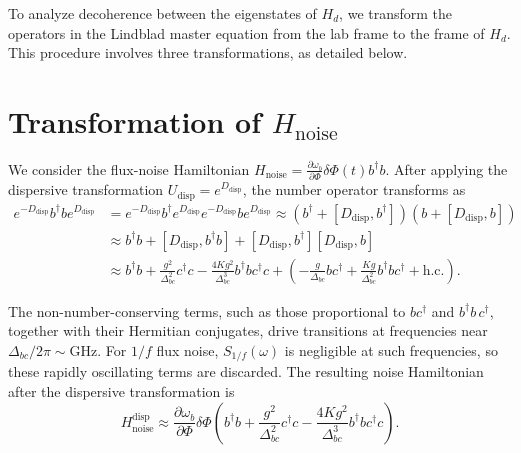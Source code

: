 To analyze decoherence between the eigenstates of $H_d$, we transform the operators in the Lindblad master equation from the lab frame to the frame of $H_d$. This procedure involves three transformations, as detailed below.

\section*{Transformation of $H_{\mathrm{noise}}$}
\label{subsec:Hnoise_transfer}

We consider the flux-noise Hamiltonian
$H_{\mathrm{noise}} = \frac{\partial \omega_b}{\partial \Phi} \delta \Phi(t) b^\dagger b$.
After applying the dispersive transformation $U_{\mathrm{disp}} = e^{D_{\mathrm{disp}}}$, the number operator transforms as
\begin{align}
    e^{-D_{\mathrm{disp}}} b^\dagger b e^{D_{\mathrm{disp}}}
    &= e^{-D_{\mathrm{disp}}} b^\dagger e^{D_{\mathrm{disp}}} e^{-D_{\mathrm{disp}}} b e^{D_{\mathrm{disp}}} \nonumber \approx \left( b^\dagger + [D_{\mathrm{disp}}, b^\dagger] \right) \left( b + [D_{\mathrm{disp}}, b] \right) \nonumber \\
    &\approx b^\dagger b + [D_{\mathrm{disp}}, b^\dagger b] + [D_{\mathrm{disp}}, b^\dagger][D_{\mathrm{disp}}, b] \nonumber \\
    &\approx b^\dagger b + \frac{g^2}{\Delta_{bc}^2} c^\dagger c - \frac{4Kg^2}{\Delta_{bc}^3} b^\dagger b c^\dagger c \nonumber+ \left( -\frac{g}{\Delta_{bc}} b c^\dagger + \frac{Kg}{\Delta_{bc}^2} b^\dagger b c^\dagger + \text{h.c.} \right).
\end{align}

The non-number-conserving terms, such as those proportional to $b c^\dagger$ and $b^\dagger b\, c^\dagger$, together with their Hermitian conjugates, drive transitions at frequencies near $\Delta_{bc}/2\pi \sim \mathrm{GHz}$. For $1/f$ flux noise, $S_{1/f}(\omega)$ is negligible at such frequencies, so these rapidly oscillating terms are discarded. The resulting noise Hamiltonian after the dispersive transformation is
\begin{equation}
    H_{\mathrm{noise}}^{\mathrm{disp}} \approx \frac{\partial \omega_b}{\partial \Phi} \delta \Phi \left( b^\dagger b + \frac{g^2}{\Delta_{bc}^2} c^\dagger c - \frac{4Kg^2}{\Delta_{bc}^3} b^\dagger b c^\dagger c \right).
\end{equation}

